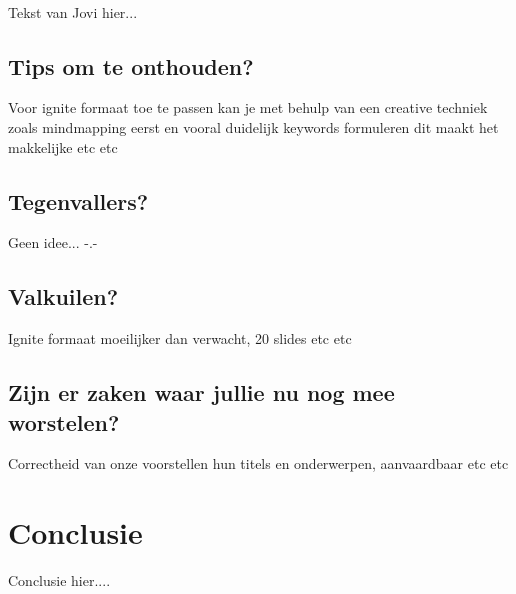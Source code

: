 \documentclass[fleqn,10pt]{voorstel}
\begin{document}
\paragraph{\cite{DeCroock2016}}
Tekst van Jovi hier...

\subsection{Tips om te onthouden?}
Voor ignite formaat toe te passen kan je met behulp van een creative techniek zoals mindmapping eerst en vooral 
duidelijk keywords formuleren dit maakt het makkelijke etc etc

\subsection{Tegenvallers?}
Geen idee... -.-

\subsection{Valkuilen?}
Ignite formaat moeilijker dan verwacht, 20 slides etc etc

\subsection{Zijn er zaken waar jullie nu nog mee worstelen?}
Correctheid van onze voorstellen hun titels en onderwerpen, aanvaardbaar etc etc

\section{Conclusie}
Conclusie hier....



\end{document}
